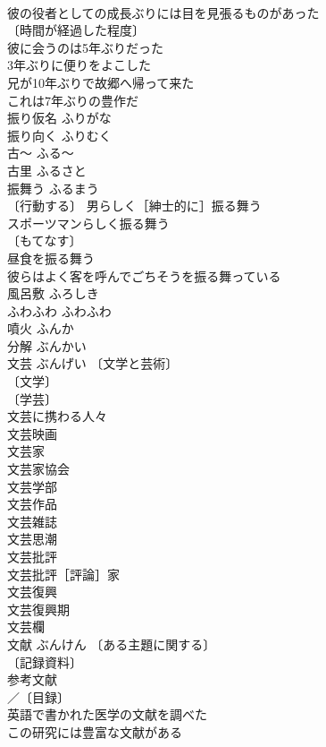 \documentclass[8pt]{extreport}
\begin{document}
\begin{CJK}{UTF8}{min}
\\	彼の役者としての成長ぶりには目を見張るものがあった 
\\	〔時間が経過した程度〕　
\\	彼に会うのは5年ぶりだった 
\\	3年ぶりに便りをよこした 
\\	兄が10年ぶりで故郷へ帰って来た 
\\	これは7年ぶりの豊作だ 
\\	振り仮名	ふりがな	
\\	振り向く	ふりむく	
\\	古～	ふる～	
\\	古里	ふるさと	
\\	振舞う	ふるまう	
\\	〔行動する〕 男らしく［紳士的に］振る舞う 
\\	スポーツマンらしく振る舞う 
\\	〔もてなす〕　
\\	昼食を振る舞う 
\\	彼らはよく客を呼んでごちそうを振る舞っている 
\\	風呂敷	ふろしき	
\\	ふわふわ	ふわふわ	
\\	噴火	ふんか	
\\	分解	ぶんかい	
\\	文芸	ぶんげい	〔文学と芸術〕
\\	〔文学〕
\\	〔学芸〕
\\	文芸に携わる人々 
\\	文芸映画 
\\	文芸家 
\\	文芸家協会 
\\	文芸学部 
\\	文芸作品 
\\	文芸雑誌 
\\	文芸思潮 
\\	文芸批評 
\\	文芸批評［評論］家 
\\	文芸復興 
\\	文芸復興期 
\\	文芸欄 
\\	文献	ぶんけん	〔ある主題に関する〕
\\	〔記録資料〕
\\	参考文献 
\\	／〔目録〕
\\	英語で書かれた医学の文献を調べた 
\\	この研究には豊富な文献がある 

\end{CJK}
\end{document}
